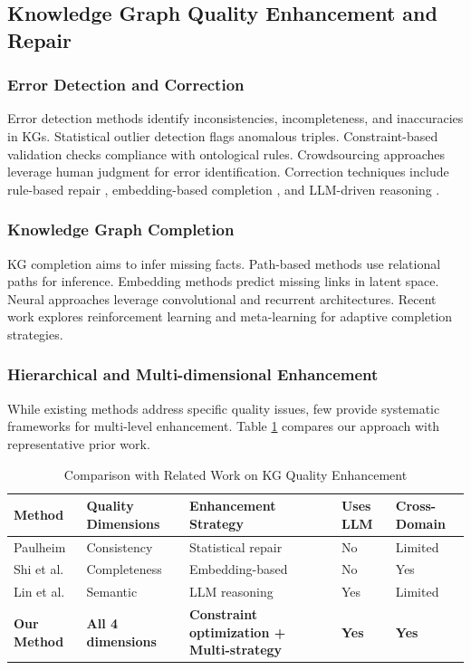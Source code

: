 \documentclass[runningheads]{llncs}
\begin{document}
\subsection{Knowledge Graph Quality Enhancement and Repair}

\subsubsection{Error Detection and Correction}
Error detection methods identify inconsistencies, incompleteness, and inaccuracies in KGs. Statistical outlier detection \cite{ref_wienand2014} flags anomalous triples. Constraint-based validation \cite{ref_kontokostas2014} checks compliance with ontological rules. Crowdsourcing approaches \cite{ref_acosta2013} leverage human judgment for error identification. Correction techniques include rule-based repair \cite{ref_paulheim2014}, embedding-based completion \cite{ref_shi2017}, and LLM-driven reasoning \cite{ref_lin2025}.

\subsubsection{Knowledge Graph Completion}
KG completion aims to infer missing facts. Path-based methods \cite{ref_lao2011} use relational paths for inference. Embedding methods \cite{ref_bordes2013,ref_yang2015} predict missing links in latent space. Neural approaches \cite{ref_dettmers2018} leverage convolutional and recurrent architectures. Recent work explores reinforcement learning \cite{ref_das2018} and meta-learning \cite{ref_chen2019} for adaptive completion strategies.

\subsubsection{Hierarchical and Multi-dimensional Enhancement}
While existing methods address specific quality issues, few provide systematic frameworks for multi-level enhancement. Table \ref{tab:related_work_comparison} compares our approach with representative prior work.

\begin{table}[H]
    \centering
    \caption{Comparison with Related Work on KG Quality Enhancement}
    \label{tab:related_work_comparison}
    \begin{tabular}{p{3cm} p{2cm} p{2.5cm} p{1.5cm} p{2cm}}
    \toprule
    \textbf{Method} & \textbf{Quality Dimensions} & \textbf{Enhancement Strategy} & \textbf{Uses LLM} & \textbf{Cross-Domain} \\
    \midrule
    Paulheim \cite{ref_paulheim2014} & Consistency & Statistical repair & No & Limited \\
    Shi et al. \cite{ref_shi2017} & Completeness & Embedding-based & No & Yes \\
    Lin et al. \cite{ref_lin2025} & Semantic & LLM reasoning & Yes & Limited \\
    \textbf{Our Method} & \textbf{All 4 dimensions} & \textbf{Constraint optimization + Multi-strategy} & \textbf{Yes} & \textbf{Yes} \\
    \bottomrule
    \end{tabular}
\end{table}
\end{document}
